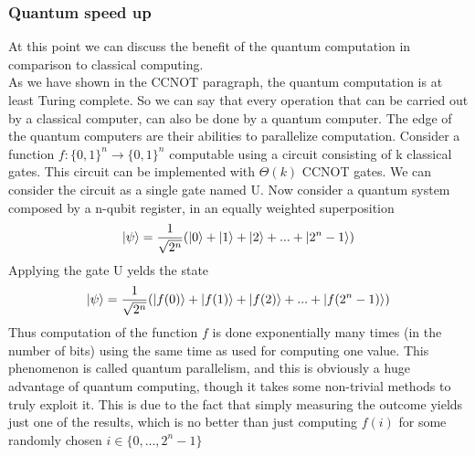 \documentclass[main.tex]{subfiles}
\begin{document}
	\subsubsection{Quantum speed up} At this point we can discuss the benefit of the quantum 
	computation in comparison to classical computing. \\
	As we have shown in the CCNOT paragraph, the quantum computation is at least Turing complete. So
	we can say that every operation that can be carried out by a classical computer, can also be done by 
	a quantum computer. The edge of the quantum computers are their abilities to parallelize 
	computation. Consider a function $f: \{0, 1\}^n\rightarrow\{0, 1\}^n$ computable using a circuit 
	consisting of k classical gates.
	This circuit can be implemented with $\Theta(k)$ CCNOT gates. We can consider the circuit as a 
	single gate named U. Now consider a quantum system composed by a n-qubit register, in an equally 
	weighted superposition
	\begin{equation}
	\ket{\psi}=\frac{1}{\sqrt{2^{n}}}(\ket{0}+\ket{1}+\ket{2}+...+\ket{2^{n}-1})
	\end{equation}
	Applying the gate U yelds the state
	\begin{equation}
	\ket{\psi}=\frac{1}{\sqrt{2^{n}}}(\ket{f(0)}+\ket{f(1)}+\ket{f(2)}+...+\ket{f(2^{n}-1)})
	\end{equation}
	Thus computation of the function $f$ is done exponentially many times (in the number
of bits) using the same time as used for computing one value. This phenomenon
is called quantum parallelism, and this is obviously a huge advantage of quantum
computing, though it takes some non-trivial methods to truly exploit it. This is due
to the fact that simply measuring the outcome yields just one of the results, which
is no better than just computing $f(i)$ for some randomly chosen $i\in\{0,...,2^{n}-1\}$
\end{document}
